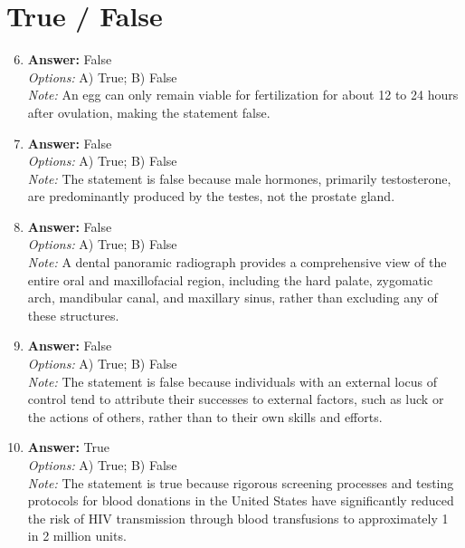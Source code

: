 \documentclass[12pt]{article}
\begin{document}
\section*{True / False}
\begin{enumerate}[label=\arabic*.]
\setcounter{enumi}{5}
\item \textbf{Answer:} False
\\ \textit{Options:} A) True; B) False
\\ \textit{Note:} An egg can only remain viable for fertilization for about 12 to 24 hours after ovulation, making the statement false.
\item \textbf{Answer:} False
\\ \textit{Options:} A) True; B) False
\\ \textit{Note:} The statement is false because male hormones, primarily testosterone, are predominantly produced by the testes, not the prostate gland.
\item \textbf{Answer:} False
\\ \textit{Options:} A) True; B) False
\\ \textit{Note:} A dental panoramic radiograph provides a comprehensive view of the entire oral and maxillofacial region, including the hard palate, zygomatic arch, mandibular canal, and maxillary sinus, rather than excluding any of these structures.
\item \textbf{Answer:} False
\\ \textit{Options:} A) True; B) False
\\ \textit{Note:} The statement is false because individuals with an external locus of control tend to attribute their successes to external factors, such as luck or the actions of others, rather than to their own skills and efforts.
\item \textbf{Answer:} True
\\ \textit{Options:} A) True; B) False
\\ \textit{Note:} The statement is true because rigorous screening processes and testing protocols for blood donations in the United States have significantly reduced the risk of HIV transmission through blood transfusions to approximately 1 in 2 million units.
\end{enumerate}
\end{document}
